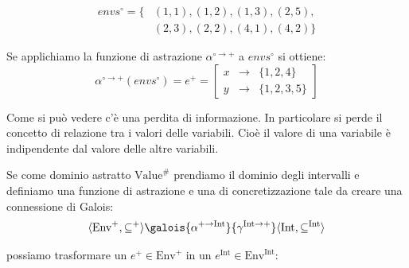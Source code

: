 \documentclass{article}
\newcommand{\envplus}{\textrm{Env}^+}
\begin{document}
\begin{align*}
envs^{\circ} = \{&(1,1),(1,2),(1,3),(2,5),	\\		   &(2,3),(2,2),(4,1),(4,2)\}
\end{align*}
\begin{center}
\end{center}

Se applichiamo la funzione di astrazione \(\alpha^{\circ\rightarrow +}\) a \(envs^{\circ}\) si ottiene:
\[
  \alpha^{\circ\rightarrow +}(envs^{\circ}) =
  e^+ = 
  \left[
  \begin{array}{ccc}
  x &\longrightarrow &\{1, 2, 4\} \\
  y &\longrightarrow &\{1, 2, 3, 5\}
  \end{array}
  \right]
\]
\begin{center}
\end{center}

Come si può vedere c'è una perdita di informazione. In particolare si perde il concetto di relazione tra i valori delle variabili. Cioè il valore di una variabile è indipendente dal valore delle altre variabili.

Se come dominio astratto \(\textrm{Value}^{\#}\) prendiamo il dominio degli intervalli e definiamo una funzione di astrazione e una di concretizzazione tale da creare una connessione di Galois:
 \[\langle\envplus, \subseteq^+\rangle
\galois
	{\alpha^{+\rightarrow \textrm{Int}}}
	{\gamma^{\textrm{Int}\rightarrow +}}
	\langle\textrm{Int}, \subseteq^{\textrm{Int}}\rangle\]

possiamo trasformare un \(e^+\in\envplus\) in un \(e^{\textrm{Int}}\in\textrm{Env}^{\textrm{Int}}\):
\end{document}

